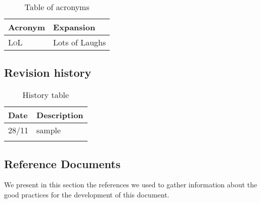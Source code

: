 \begin{table}[H]
    \setlength\arrayrulewidth{1pt}
    \centering
    \begin{tabular}{|l|l|}
        \rowcolor{myblue}
        \hline
        \color{white}Acronym & \color{white}Expansion \\
        \hline
        \textsc{LoL}  &    Lots of Laughs \\
        \hline
        
    \end{tabular}
    
    \caption{\label{tab:acronymsTable}Table of acronyms}
    
\end{table}

\subsection{Revision history}
\label{sec:history}
\begin{center}
    \setlength\arrayrulewidth{1pt}
    \begin{longtable}{ll}
        
        \hline
        \rowcolor{myblue}\color{white}Date & \color{white}Description \\
        \hline
        28/11	&	sample\\
        \hline
        
        \rowcolor{white}\caption{\label{tab:history}History table}
        
    \end{longtable}
\end{center}
\subsection{Reference Documents}
\label{sec:ref_docs}
We present in this section the references we used to gather information about the good practices for the development of this document.
\begingroup
\renewcommand{\section}[2]{}%
\nocite{*}


\endgroup

